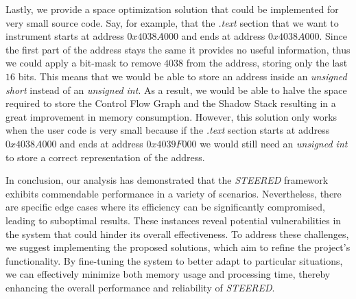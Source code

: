 Lastly, we provide a space optimization solution that could be implemented for very
small source code. Say, for example, that the \textit{.text} section that we want
to instrument starts at address $0x4038A000$ and ends at address $0x4038A000$.
Since the first part of the address stays the same it provides no useful
information, thus we could apply a bit-mask to remove $4038$ from the address,
storing only the last $16$ bits. This means that we would be able to store an address
inside an \textit{unsigned short} instead of an \textit{unsigned int}. As a
result, we would be able to halve the space required to store the Control Flow Graph
and the Shadow Stack resulting in a great improvement in memory consumption.
However, this solution only works when the user code is very small because if the
\textit{.text} section starts at address $0x4038A000$ and ends at address
$0x4039F000$ we would still need an \textit{unsigned int} to store a correct representation
of the address.

In conclusion, our analysis has demonstrated that the \textit{STEERED} framework
exhibits commendable performance in a variety of scenarios. Nevertheless, there are
specific edge cases where its efficiency can be significantly compromised,
leading to suboptimal results. These instances reveal potential vulnerabilities in
the system that could hinder its overall effectiveness. To address these
challenges, we suggest implementing the proposed solutions, which aim to refine
the project's functionality. By fine-tuning the system to better adapt to particular
situations, we can effectively minimize both memory usage and processing time, thereby
enhancing the overall performance and reliability of \textit{STEERED}.